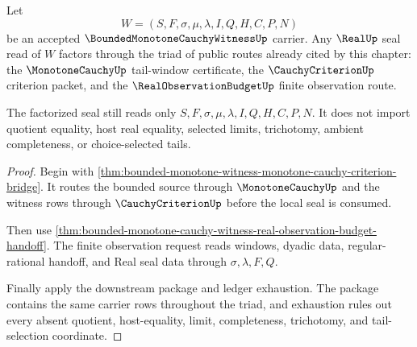 \begin{theorem}
\label{thm:bounded-monotone-cauchy-witness-seal-factorization-triad}
Let
$$
W=(S,F,\sigma,\mu,\lambda,I,Q,H,C,P,N)
$$
be an accepted $\BoundedMonotoneCauchyWitnessUp$ carrier. Any $\RealUp$ seal read of $W$ factors through the triad of public routes already cited by this chapter: the $\MonotoneCauchyUp$ tail-window certificate, the $\CauchyCriterionUp$ criterion packet, and the $\RealObservationBudgetUp$ finite observation route.

The factorized seal still reads only $S,F,\sigma,\mu,\lambda,I,Q,H,C,P,N$. It does not import quotient equality, host real equality, selected limits, trichotomy, ambient completeness, or choice-selected tails.
\end{theorem}
\begin{proof}
Begin with \autoref{thm:bounded-monotone-witness-monotone-cauchy-criterion-bridge}. It routes the bounded source through $\MonotoneCauchyUp$ and the witness rows through $\CauchyCriterionUp$ before the local seal is consumed.

Then use \autoref{thm:bounded-monotone-cauchy-witness-real-observation-budget-handoff}. The finite observation request reads windows, dyadic data, regular-rational handoff, and Real seal data through $\sigma,\lambda,F,Q$.

Finally apply the downstream package and ledger exhaustion. The package contains the same carrier rows throughout the triad, and exhaustion rules out every absent quotient, host-equality, limit, completeness, trichotomy, and tail-selection coordinate.
\end{proof}

